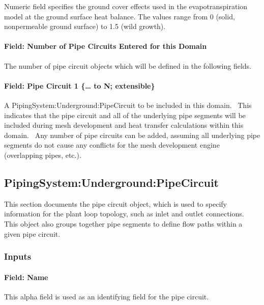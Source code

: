Numeric field specifies the ground cover effects used in the evapotranspiration model at the ground surface heat balance. The values range from 0 (solid, nonpermeable ground surface) to 1.5 (wild growth).

\paragraph{Field: Number of Pipe Circuits Entered for this Domain}\label{field-number-of-pipe-circuits-entered-for-this-domain}

The number of pipe circuit objects which will be defined in the following fields.

\paragraph{Field: Pipe Circuit 1 \{\ldots{} to N; extensible\}}\label{field-pipe-circuit-1-to-n-extensible}

A PipingSystem:Underground:PipeCircuit to be included in this domain.~ This indicates that the pipe circuit and all of the underlying pipe segments will be included during mesh development and heat transfer calculations within this domain.~ Any number of pipe circuits can be added, assuming all underlying pipe segments do not cause any conflicts for the mesh development engine (overlapping pipes, etc.).

\subsection{PipingSystem:Underground:PipeCircuit}\label{pipingsystemundergroundpipecircuit}

This section documents the pipe circuit object, which is used to specify information for the plant loop topology, such as inlet and outlet connections.~ This object also groups together pipe segments to define flow paths within a given pipe circuit.

\subsubsection{Inputs}\label{inputs-10-010}

\paragraph{Field: Name}\label{field-name-10-009}

This alpha field is used as an identifying field for the pipe circuit.

